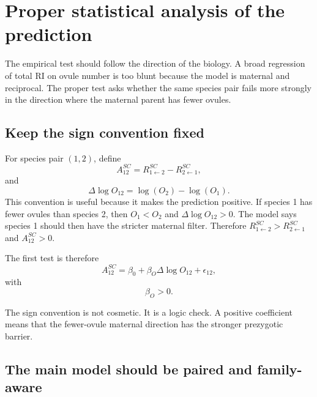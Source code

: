 \section{Proper statistical analysis of the prediction}

The empirical test should follow the direction of the biology. A broad regression of total RI on ovule number is too blunt because the model is maternal and reciprocal. The proper test asks whether the same species pair fails more strongly in the direction where the maternal parent has fewer ovules.

\subsection{Keep the sign convention fixed}

For species pair $(1,2)$, define
\begin{equation}
A^{SC}_{12}=R^{SC}_{1\leftarrow 2}-R^{SC}_{2\leftarrow 1},
\label{eq:analysis-A-SC}
\end{equation}
and
\begin{equation}
\Delta\log O_{12}=\log(O_2)-\log(O_1).
\label{eq:analysis-dlogO}
\end{equation}
This convention is useful because it makes the prediction positive. If species 1 has fewer ovules than species 2, then $O_1<O_2$ and $\Delta\log O_{12}>0$. The model says species 1 should then have the stricter maternal filter. Therefore $R^{SC}_{1\leftarrow 2}>R^{SC}_{2\leftarrow 1}$ and $A^{SC}_{12}>0$.

The first test is therefore
\begin{equation}
A^{SC}_{12}=\beta_0+\beta_O\Delta\log O_{12}+\epsilon_{12},
\label{eq:first-plain-analysis}
\end{equation}
with
\begin{equation}
\boxed{\beta_O>0.}
\end{equation}

\begin{conclusionbox}
The sign convention is not cosmetic. It is a logic check. A positive coefficient means that the fewer-ovule maternal direction has the stronger prezygotic barrier.
\end{conclusionbox}

\subsection{The main model should be paired and family-aware}


